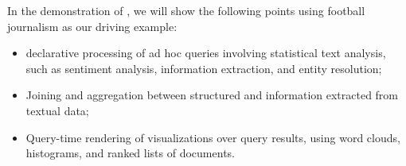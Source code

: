 {%
}


In the demonstration of \system, we will show the 
following points using football journalism as our driving example:
\begin{itemize}[noitemsep]
\item declarative processing of ad hoc queries 
involving statistical text analysis, such as sentiment analysis,
information extraction, and entity resolution;
\item Joining and aggregation between structured and information extracted
from textual data;
\item Query-time rendering of visualizations over query results, using 
word clouds, histograms, and ranked lists of documents.
\end{itemize}

